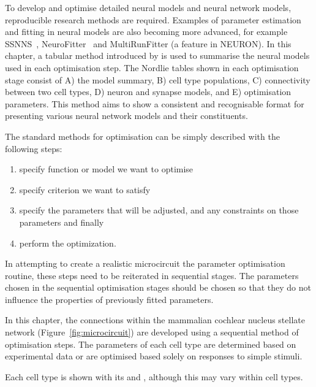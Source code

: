 To develop and optimise detailed neural models and neural network models, reproducible research methods are required. 
Examples of parameter estimation and fitting in neural models are also becoming more advanced, for example SSNNS~\citep{SichtigSchafferEtAl:2008}, NeuroFitter \citep{VanAchardEtAl:2007}~and MultiRunFitter (a feature in NEURON).
In this chapter, a tabular method introduced by \citet{NordlieGewaltigEtAl:2009} is used to summarise the neural models used in each optimisation step.
The Nordlie tables shown in each optimisation stage consist of A) the model summary, B) cell type populations, C) connectivity between two cell types, D) neuron and synapse models, and E) optimisation parameters.
This method aims to show a consistent and recognisable format for presenting various neural network models and their constituents.


The standard methods for optimisation can be simply described with the following
steps: \begin{enumerate}
\item specify function or model we want to optimise
\item specify criterion we want to satisfy
\item specify the parameters that will be adjusted,
  and any constraints on those parameters and finally
\item perform the optimization.
  \end{enumerate}

In attempting to create a realistic microcircuit the parameter optimisation routine, these steps need to be reiterated in sequential stages.
The parameters chosen in the sequential optimisation stages should be chosen so that they do not influence the properties of previously fitted parameters.


In this chapter, the connections within the mammalian cochlear nucleus stellate network (Figure~\ref{fig:microcircuit}) are developed using a sequential method of optimisation steps.
The parameters of each cell type are determined based on experimental data or are optimised based solely on responses to simple stimuli.


Each cell type is shown with its \EIRA and \PSTH, although this may vary within cell types.

